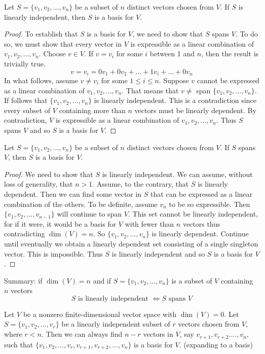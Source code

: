 \documentclass[12pt]{article}
\begin{document}
\begin{theorem} Let $S = \{v_1, v_2, \dots, v_n\}$ be a subset of $n$ distinct vectors chosen from $V$. If $S$ is linearly independent, then $S$ is a basis for $V$. \end{theorem} \begin{proof} 
To establish that $S$ is a basis for $V$, we need to show that $S$ spans $V$. To do so, we must show that every vector in $V$ is expressible as a linear combination of $v_1, v_2, \dots, v_n$. Choose $v \in V$. If $v = v_i$ for some $i$ between 1 and $n$, then the result is trivially true. $$ v = v_i = 0v_1 + 0v_2 + \dots + 1v_i + \dots + 0v_n$$ In what follows, assume $v \neq v_i$ for some $1 \leq i \leq n$. Suppose $v$ cannot be expressed as a linear combination of $v_1, v_2, \dots, v_n$. That means that $v \neq$ span $\{v_1, v_2, \dots, v_n\}$. If follows that $\{v_1, v_2, \dots, v_n\}$ is linearly independent. This is a contradiction since every subset of $V$ containing more than $n$ vectors must be linearly dependent. By contradiction, $V$ is expressible as a linear combination of $v_1, v_2, \dots, v_n$. Thus $S$ spans $V$ and so $S$ is a basis for $V$. \end{proof} 
\begin{theorem} Let $S = \{v_1, v_2, \dots, v_n\}$ be a subset of $n$ distinct vectors chosen from $V$. If $S$ spans $V$, then $S$ is a basis for $V$. \end{theorem} 
\begin{proof} We need to show that $S$ is linearly independent. We can assume, without loss of generality, that $n > 1$. Assume, to the contrary, that $S$ is linearly dependent. Then we can find some vector in $S$ that can be expressed as a linear combination of the others. To be definite, assume $v_n$ to be so expressible. Then $\{v_1, v_2, \dots, v_{n - 1}\}$ will continue to span $V$. This set cannot be linearly independent, for if it were, it would be a basis for $V$ with fewer than $n$ vectors thus contradicting $\dim(V) = n$. So $\{v_1, v_2, \dots, v_n\}$ is linearly dependent. Continue until eventually we obtain a linearly dependent set consisting of a single singleton vector. This is impossible. Thus $S$ is linearly independent and so $S$ is a basis for $V$. \end{proof} 
Summary: if $\dim(V) = n$ and if $S = \{v_1, v_2, \dots, v_n\}$ is a subset of $V$ containing $n$ vectors $$ S \text{ is linearly independent } \Longleftrightarrow S \text{ spans } V $$ 
\begin{theorem} Let $V$ be a nonzero finite-dimensional vector space with $\dim(V) = 0$. Let $S= \{v_1, v_2, \dots, v_r\}$ be a linearly independent subset of $r$ vectors chosen from $V$, where $ r < n$. Then we can always find $n - r$ vectors in $V$, say $v_{r + 1}, v_{r + 2}. \dots, v_n$, such that $\{v_1, v_2, \dots, v_r, v_{r + 1}, v_{r + 2}, \dots, v_n\}$ is a basis for $V$. (expanding to a basis) \end{theorem} 
\end{document}
